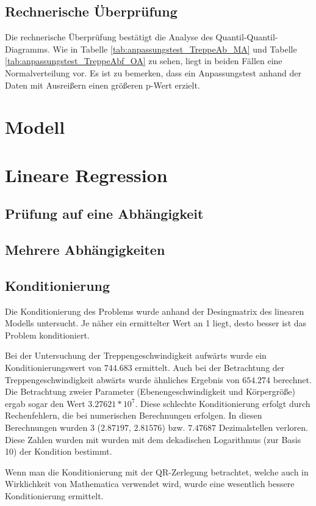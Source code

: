 \subsection{Rechnerische Überprüfung}
Die rechnerische Überprüfung bestätigt die Analyse des Quantil-Quantil-Diagramms. Wie in Tabelle \ref{tab:anpassungstest_TreppeAb_MA} und Tabelle \ref{tab:anpassungstest_TreppeAbf_OA} zu sehen, liegt in beiden Fällen eine Normalverteilung vor. Es ist zu bemerken, dass ein Anpassungstest anhand der Daten mit Ausreißern einen größeren p-Wert erzielt. 


\section{Modell}
\section{Lineare Regression}
\subsection{Prüfung auf eine Abhängigkeit}
\subsection{Mehrere Abhängigkeiten}
\subsection{Konditionierung}
Die Konditionierung des Problems wurde anhand der Desingmatrix des linearen Modells untersucht. Je näher ein ermittelter Wert an 1 liegt, desto besser ist das Problem konditioniert.

Bei der Untersuchung der Treppengeschwindigkeit aufwärts wurde ein Konditionierungswert von $744.683$ ermittelt. Auch bei der Betrachtung der Treppengeschwindigkeit abwärts wurde ähnliches Ergebnis von $654.274$ berechnet. Die Betrachtung zweier Parameter (Ebenengeschwindigkeit und Körpergröße) ergab sogar den Wert $3.27621*10^7$.
Diese schlechte Konditionierung erfolgt durch Rechenfehlern, die bei numerischen Berechnungen erfolgen. In diesen Berechnungen wurden 3 ($2.87197$, $2.81576$) bzw. $7.47687$ Dezimalstellen verloren. Diese Zahlen wurden mit wurden mit dem dekadischen Logarithmus (zur Basis 10) der Kondition bestimmt.

Wenn man die Konditionierung mit der QR-Zerlegung betrachtet, welche auch in Wirklichkeit von Mathematica verwendet wird, wurde eine wesentlich bessere Konditionierung ermittelt.

